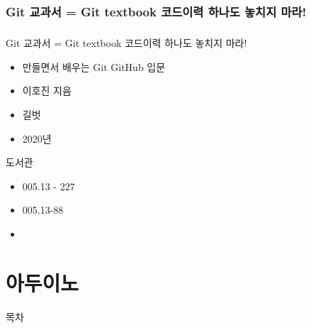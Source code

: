 \documentclass[aspectratio=1610,17pt,xcolor=pdftex,dvipsnames,table,handout]{beamer}
\begin{document}
		\section 	{Git 교과서 = Git textbook 코드이력 하나도 놓치지 마라!}
		\begin{frame} [t,plain]
		\frametitle{}
			\begin{block}  {Git 교과서 = Git textbook 코드이력 하나도 놓치지 마라!}
			\setlength{\leftmargini}{4em}			
			\begin{itemize} 
				\item [제목]  	만들면서 배우는 Git GitHub 입문
				\item [지은이]	이호진 지음
				\item [출판사]	길벗
				\item [출판일]	2020년
			\end{itemize}
			\end{block}						

			\begin{block}  {도서관}
			\setlength{\leftmargini}{4em}			
			\begin{itemize}
				\item [중앙]		005.13 - 227
				\item [수정]		005.13-88
				\item [도서관]
			\end{itemize}
			\end{block}						
								
		\end{frame}						

		\part{ 아두이노 }
		\frame{\partpage}
		
		\begin{frame} [plain]{목차}
		\tableofcontents%
		\end{frame}
		





\end{document}
